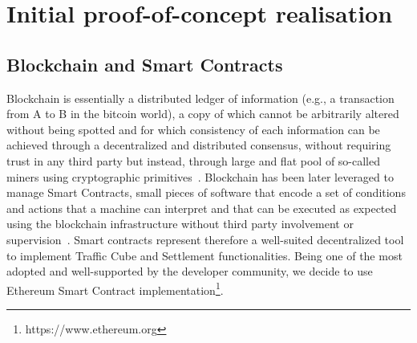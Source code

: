 \section{Initial proof-of-concept realisation}  \label{eq:realisation}

%
%
%
	
	
	


\subsection{Blockchain and Smart Contracts}  \label{sec:blockchain}
Blockchain is essentially a distributed ledger of information (e.g., a transaction from A to B in the bitcoin world), a copy of which cannot be arbitrarily altered without being spotted and for which consistency of each information can be achieved through a decentralized and distributed consensus, without requiring trust in any third party but instead, through large and flat pool of so-called miners using cryptographic primitives~\cite{nakamoto2008bitcoin}.
Blockchain has been later leveraged to manage Smart Contracts, small pieces of software that encode a set of conditions and actions that a machine can interpret and that can be executed as expected using the blockchain infrastructure without third party involvement or supervision~\cite{Buterin2014}. Smart contracts represent therefore a well-suited decentralized tool to implement Traffic Cube and Settlement functionalities. Being one of the most adopted and well-supported by the developer community, we decide to use Ethereum Smart Contract implementation\footnote{https://www.ethereum.org}.


